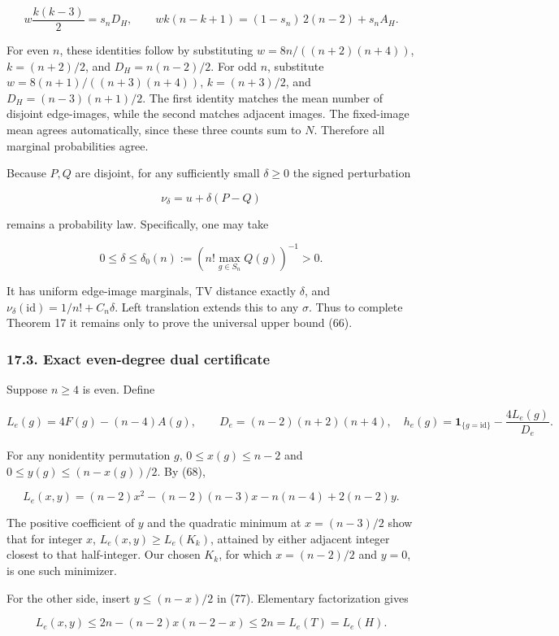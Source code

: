 \documentclass[
  11pt,
]{article}
\begin{document}
\[
w\frac{k(k-3)}2=s_nD_H,\qquad
wk(n-k+1)=(1-s_n)\,2(n-2)+s_n A_H. \tag{74}
\]

For even \(n\), these identities follow by substituting
\(w=8n/((n+2)(n+4))\), \(k=(n+2)/2\), and \(D_H=n(n-2)/2\). For odd
\(n\), substitute \(w=8(n+1)/((n+3)(n+4))\), \(k=(n+3)/2\), and
\(D_H=(n-3)(n+1)/2\). The first identity matches the mean number of
disjoint edge-images, while the second matches adjacent images. The
fixed-image mean agrees automatically, since these three counts sum to
\(N\). Therefore all marginal probabilities agree.

Because \(P,Q\) are disjoint, for any sufficiently small \(\delta\ge0\)
the signed perturbation

\[
\nu_\delta=u+\delta(P-Q) \tag{75}
\]

remains a probability law. Specifically, one may take

\[
0\le\delta\le \delta_0(n):=
\left(n!\max_{g\in S_n}Q(g)\right)^{-1}>0.
\]

It has uniform edge-image marginals, TV distance exactly \(\delta\), and
\(\nu_\delta(\mathrm{id})=1/n!+C_n\delta\). Left translation extends
this to any \(\sigma\). Thus to complete Theorem 17 it remains only to
prove the universal upper bound (66).

\subsubsection{17.3. Exact even-degree dual
certificate}\label{exact-even-degree-dual-certificate}

Suppose \(n\ge4\) is even. Define

\[
L_e(g)=4F(g)-(n-4)A(g),\qquad
D_e=(n-2)(n+2)(n+4),
\quad h_e(g)=\mathbf1_{\{g=\mathrm{id}\}}-\frac{4L_e(g)}{D_e}. \tag{76}
\]

For any nonidentity permutation \(g\), \(0\le x(g)\le n-2\) and
\(0\le y(g)\le(n-x(g))/2\). By (68),

\[
L_e(x,y)=
(n-2)x^2-(n-2)(n-3)x-n(n-4)+2(n-2)y. \tag{77}
\]

The positive coefficient of \(y\) and the quadratic minimum at
\(x=(n-3)/2\) show that for integer \(x\), \(L_e(x,y)\ge L_e(K_k)\),
attained by either adjacent integer closest to that half-integer. Our
chosen \(K_k\), for which \(x=(n-2)/2\) and \(y=0\), is one such
minimizer.

For the other side, insert \(y\le(n-x)/2\) in (77). Elementary
factorization gives

\[
L_e(x,y)\le 2n-(n-2)x(n-2-x)\le2n=L_e(T)=L_e(H). \tag{78}
\]
\end{document}
